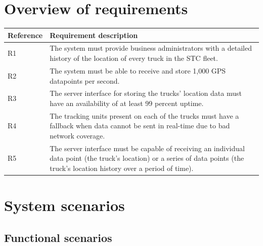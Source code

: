 \documentclass[a4paper,11pt]{report}
\begin{document}
\section{Overview of requirements}
\label{sec:overv-requ}

\begin{center}
  \begin{tabular}[h!]{| p{} | p{} |}
    \hline
    \rowcolor{gray}
    Reference & Requirement description \\
    \hline
    \hline
    R1 & The system must provide business administrators with a detailed
    history of the location of every truck in the STC fleet. \\
    \hline
    R2 & The system must be able to receive and store 1,000 GPS datapoints per
    second. \\
    \hline
    R3 & The server interface for storing the trucks' location data must have
    an availability of at least 99 percent uptime. \\
    \hline
    R4 & The tracking units present on each of the trucks must have a fallback
    when data cannot be sent in real-time due to bad network coverage. \\
    \hline
    R5 & The server interface must be capable of receiving an individual data
    point (the truck's location) or a series of data points (the truck's
    location history over a period of time). \\
    \hline
  \end{tabular}
\end{center}

\section{System scenarios}
\label{sec:system-scenarios}

\subsection{Functional scenarios}
\label{sec:functional-scenarios}
\end{document}
